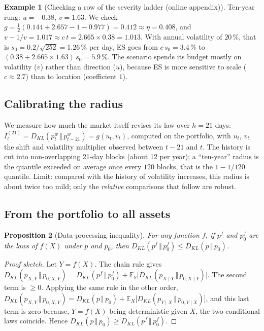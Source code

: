 \documentclass[11pt]{article}
\theoremstyle{plain}
\newtheorem{proposition}{Proposition}[section]
\theoremstyle{definition}
\newtheorem{exemple}[proposition]{Example}
\theoremstyle{remark}
\newcommand{\E}{\mathbb{E}}
\newcommand{\KL}[2]{D_{KL}\!\left(#1\,\Vert\,#2\right)}
\begin{document}
\begin{exemple}[Checking a row of the severity ladder (online appendix)]
Ten-year rung: $u=-0.38$, $v=1.63$. We check
$g=\tfrac12(0.144+2.657-1-0.977)=0.412\approx\eta=0.408$, and
$v-1/v=1.017\approx c\,t=2.665\times0.38=1.013$. With annual volatility of
$20\,\%$, that is $s_0=0.2/\sqrt{252}=1.26\,\%$ per day, ES goes from
$c\,s_0=3.4\,\%$ to $(0.38+2.665\times1.63)\,s_0=5.9\,\%$. The scenario spends
its budget mostly on volatility ($v$) rather than direction ($u$), because ES
is more sensitive to scale ($c\approx2.7$) than to location (coefficient $1$).
\end{exemple}

\subsection{Calibrating the radius}

We measure how much the market itself revises its law over $h=21$ days:
$I^{(21)}_t=\KL{p_t^w}{p_{t-21}^w}=g(u_t,v_t)$, computed on the portfolio,
with $u_t$, $v_t$ the shift and volatility multiplier observed between $t-21$
and $t$. The history is cut into non-overlapping 21-day blocks (about 12 per
year); a ``ten-year'' radius is the quantile exceeded on average once every
$120$ blocks, that is the $1-1/120$ quantile. Limit: compared with the history
of volatility increases, this radius is about twice too mild; only the
\emph{relative} comparisons that follow are robust.

\subsection{From the portfolio to all assets}

\begin{proposition}[Data-processing inequality]
\label{prop:dpi}
For any function $f$, if $p^f$ and $p_0^f$ are the laws of $f(X)$ under $p$
and $p_0$, then $\KL{p^f}{p_0^f}\le\KL{p}{p_0}$.
\end{proposition}

\begin{proof}[Proof sketch]
Let $Y=f(X)$. The chain rule gives
$\KL{p_{X,Y}}{p_{0,X,Y}}=\KL{p^f}{p_0^f}+\E_{Y}\bigl[\KL{p_{X\mid Y}}{p_{0,X\mid Y}}\bigr]$.
The second term is $\ge0$. Applying the same rule in the other order,
$\KL{p_{X,Y}}{p_{0,X,Y}}=\KL{p}{p_0}+\E_X\bigl[\KL{p_{Y\mid X}}{p_{0,Y\mid X}}\bigr]$,
and this last term is zero because, $Y=f(X)$ being deterministic given $X$,
the two conditional laws coincide. Hence $\KL{p}{p_0}\ge\KL{p^f}{p_0^f}$.
\end{proof}
\end{document}
